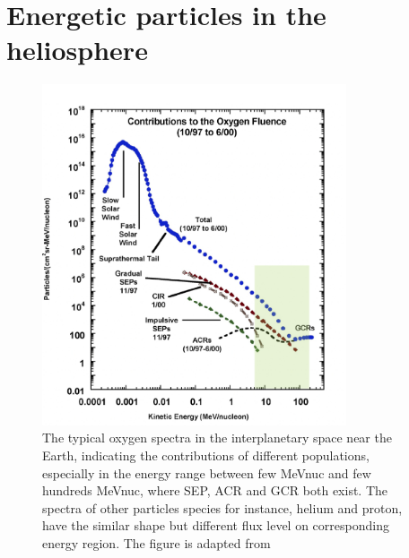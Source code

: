 \section{Energetic particles in the heliosphere}
\label{sec:particles_heliosphere}

\begin{figure}
	\centering
	\includegraphics[width = 0.8\textwidth]{images/heliospheric_particle_spectra_color.png}
	\caption[Energy spectra of oxygen ions in the near Earth space]{The typical oxygen spectra in the interplanetary space near the Earth, indicating the contributions of different populations, especially in the energy range between few MeV\/nuc and few hundreds MeV\/nuc, where \acs{SEP}, \acs{ACR} and \acs{GCR} both exist. The spectra of other particles species for instance, helium and proton, have the similar shape but different flux level on corresponding energy region. The figure is adapted from \cite{Mewaldt-2001}}
	\label{Fig:Oxygen_spectra_heliosphere}
\end{figure}

